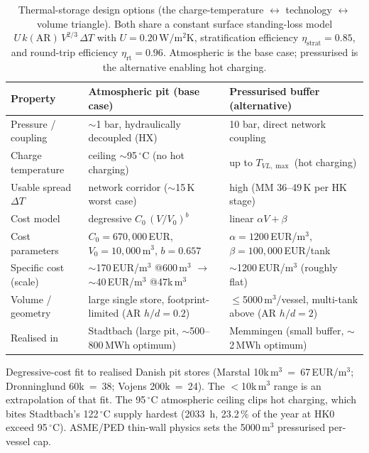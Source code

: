 \begin{table}[htbp]
  \centering
  \caption{Thermal-storage design options (the charge-temperature $\leftrightarrow$
  technology $\leftrightarrow$ volume triangle). Both share a constant surface
  standing-loss model $U\,k(\mathrm{AR})\,V^{2/3}\,\Delta T$ with
  $U=0.20\,\mathrm{W/m^2K}$, stratification efficiency $\eta_{\mathrm{strat}}=0.85$,
  and round-trip efficiency $\eta_{\mathrm{rt}}=0.96$. Atmospheric is the base case;
  pressurised is the alternative enabling hot charging.}
  \label{tab:t2b_storage_tech}
  \small
  \begin{tabular}{@{}lll@{}}
  \toprule
  Property & Atmospheric pit (base case) & Pressurised buffer (alternative) \\
  \midrule
  Pressure / coupling      & $\sim$1 bar, hydraulically decoupled (HX) & 10 bar, direct network coupling \\
  Charge temperature       & ceiling $\sim$95\,$^\circ$C (no hot charging) & up to $T_{VL,\max}$ (hot charging) \\
  Usable spread $\Delta T$ & network corridor ($\sim$15\,K worst case) & high (MM 36--49\,K per HK stage) \\
  Cost model               & degressive $C_0\,(V/V_0)^{b}$ & linear $\alpha V + \beta$ \\
  Cost parameters          & $C_0=670{,}000$\,EUR, $V_0=10{,}000$\,m$^3$, $b=0.657$ & $\alpha=1200$\,EUR/m$^3$, $\beta=100{,}000$\,EUR/tank \\
  Specific cost (scale)    & $\sim$170\,EUR/m$^3$ @600\,m$^3$ $\to$ $\sim$40\,EUR/m$^3$ @47k\,m$^3$ & $\sim$1200\,EUR/m$^3$ (roughly flat) \\
  Volume / geometry        & large single store, footprint-limited (AR $h/d=0.2$) & $\le$5000\,m$^3$/vessel, multi-tank above (AR $h/d=2$) \\
  Realised in              & Stadtbach (large pit, $\sim$500--800\,MWh optimum) & Memmingen (small buffer, $\sim$2\,MWh optimum) \\
  \bottomrule
  \end{tabular}

  \vspace{2pt}
  {\footnotesize Degressive-cost fit to realised Danish pit stores (Marstal
  10k\,m$^3$~=~67\,EUR/m$^3$; Dronninglund 60k~=~38; Vojens 200k~=~24). The $<$10k\,m$^3$
  range is an extrapolation of that fit. The 95\,$^\circ$C atmospheric ceiling clips
  hot charging, which bites Stadtbach's 122\,$^\circ$C supply hardest (2033~h,
  23.2\,\% of the year at HK0 exceed 95\,$^\circ$C). ASME/PED thin-wall physics sets the
  5000\,m$^3$ pressurised per-vessel cap.}
\end{table}
